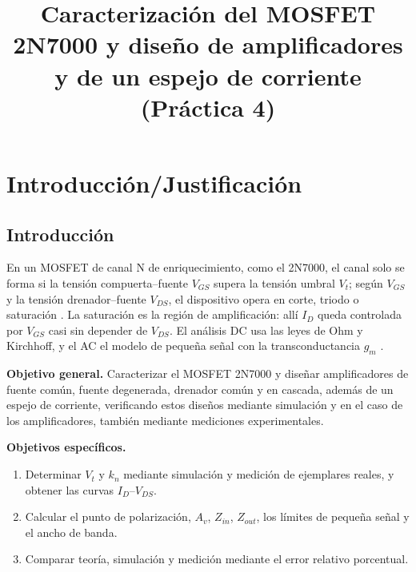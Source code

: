 \documentclass[conference]{IEEEtran}
\newcommand{\gm}{g_m}
\newcommand{\kn}{k_n}
\begin{document}
\title{Caracterización del MOSFET 2N7000 y diseño de amplificadores y de un espejo de corriente (Práctica 4)}

\author{
}

\maketitle

\section{Introducción/Justificación}

\subsection{Introducción}
En un MOSFET de canal N de enriquecimiento, como el 2N7000, el canal solo se forma si la tensión compuerta--fuente $V_{GS}$ supera la tensión umbral $V_t$; según $V_{GS}$ y la tensión drenador--fuente $V_{DS}$, el dispositivo opera en corte, triodo o saturación \cite{sedra}. La saturación es la región de amplificación: allí $I_D$ queda controlada por $V_{GS}$ casi sin depender de $V_{DS}$. El análisis DC usa las leyes de Ohm y Kirchhoff, y el AC el modelo de pequeña señal con la transconductancia $\gm$ \cite{sedra}.

\textbf{Objetivo general.} Caracterizar el MOSFET 2N7000 y diseñar amplificadores de fuente común, fuente degenerada, drenador común y en cascada, además de un espejo de corriente, verificando estos diseños mediante simulación y en el caso de los amplificadores, también mediante mediciones experimentales.

\textbf{Objetivos específicos.}
\begin{enumerate}
\item Determinar $V_t$ y $\kn$ mediante simulación y medición de ejemplares reales, y obtener las curvas $I_D$--$V_{DS}$.
\item Calcular el punto de polarización, $A_v$, $Z_{in}$, $Z_{out}$, los límites de pequeña señal y el ancho de banda.
\item Comparar teoría, simulación y medición mediante el error relativo porcentual.
\end{enumerate}
\end{document}

